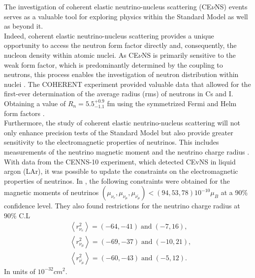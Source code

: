 The investigation of coherent elastic neutrino-nucleus scattering (CE$\nu$NS) events serves as a valuable tool for exploring physics within the Standard Model as well as beyond it.\\
Indeed, coherent elastic neutrino-nucleus scattering provides a unique opportunity to access the neutron form factor directly and, consequently, the nucleon density within atomic nuclei. As CE$\nu$NS is primarily sensitive to the weak form factor, which is predominantly determined by the coupling to neutrons, this process enables the investigation of neutron distribution within nuclei \cite{Coloma_2020}. The COHERENT experiment provided valuable data that allowed for the first-ever determination of the average radius (rms) of neutrons in Cs and I. Obtaining a value of $R_n=5.5^{+0.9}_{-1.1} $ fm using the symmetrized Fermi and Helm form factors \cite{Cadeddu_2018}.\\
Furthermore, the study of coherent elastic neutrino-nucleus scattering will not only enhance precision tests of the Standard Model but also provide greater sensitivity to the electromagnetic properties of neutrinos. This includes measurements of the neutrino magnetic moment and the neutrino charge radius \cite{Kosmas_2015}. With data from the CENNS-10 experiment, which detected CEvNS in liquid argon (LAr), it was possible to update the constraints on the electromagnetic properties of neutrinos. In \cite{Miranda_2020}, the following constraints were obtained for the magnetic moments of neutrinos $(\mu_{\nu_e},\mu_{\nu_\mu},\mu_{\bar{\nu_\mu}})< (94,53,78) 10^{-10} \mu_B$  at a 90\% confidence level. They also found restrictions for the neutrino charge radius at $90\%$ C.L\\
\begin{equation*}
\begin{split}
&\left<r^2_{\nu_e}\right> = (-64,-41) \; \text{and} \;(-7,16),\\
&\left<r^2_{\nu_\mu}\right> = (-69,-37) \; \text{and} \;(-10,21),\\
&\left<r^2_{\bar{\nu_\mu}}\right> = (-60,-43) \; \text{and} \;(-5,12).
\end{split}
\end{equation*}
In units of $10^{-32} cm^2$.


